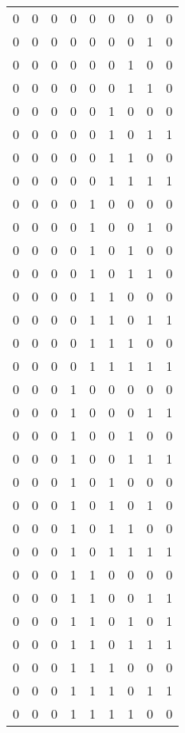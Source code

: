 \begin{longtable}[c]{rrrrrrrrr}
        0 & 0 & 0 & 0 & 0 & 0 & 0 & 0 & 0 \\
        0 & 0 & 0 & 0 & 0 & 0 & 0 & 1 & 0 \\
        0 & 0 & 0 & 0 & 0 & 0 & 1 & 0 & 0 \\
        0 & 0 & 0 & 0 & 0 & 0 & 1 & 1 & 0 \\
        0 & 0 & 0 & 0 & 0 & 1 & 0 & 0 & 0 \\
        0 & 0 & 0 & 0 & 0 & 1 & 0 & 1 & 1 \\
        0 & 0 & 0 & 0 & 0 & 1 & 1 & 0 & 0 \\
        0 & 0 & 0 & 0 & 0 & 1 & 1 & 1 & 1 \\
        0 & 0 & 0 & 0 & 1 & 0 & 0 & 0 & 0 \\
        0 & 0 & 0 & 0 & 1 & 0 & 0 & 1 & 0 \\
        0 & 0 & 0 & 0 & 1 & 0 & 1 & 0 & 0 \\
        0 & 0 & 0 & 0 & 1 & 0 & 1 & 1 & 0 \\
        0 & 0 & 0 & 0 & 1 & 1 & 0 & 0 & 0 \\
        0 & 0 & 0 & 0 & 1 & 1 & 0 & 1 & 1 \\
        0 & 0 & 0 & 0 & 1 & 1 & 1 & 0 & 0 \\
        0 & 0 & 0 & 0 & 1 & 1 & 1 & 1 & 1 \\
        0 & 0 & 0 & 1 & 0 & 0 & 0 & 0 & 0 \\
        0 & 0 & 0 & 1 & 0 & 0 & 0 & 1 & 1 \\
        0 & 0 & 0 & 1 & 0 & 0 & 1 & 0 & 0 \\
        0 & 0 & 0 & 1 & 0 & 0 & 1 & 1 & 1 \\
        0 & 0 & 0 & 1 & 0 & 1 & 0 & 0 & 0 \\
        0 & 0 & 0 & 1 & 0 & 1 & 0 & 1 & 0 \\
        0 & 0 & 0 & 1 & 0 & 1 & 1 & 0 & 0 \\
        0 & 0 & 0 & 1 & 0 & 1 & 1 & 1 & 1 \\
        0 & 0 & 0 & 1 & 1 & 0 & 0 & 0 & 0 \\
        0 & 0 & 0 & 1 & 1 & 0 & 0 & 1 & 1 \\
        0 & 0 & 0 & 1 & 1 & 0 & 1 & 0 & 1 \\
        0 & 0 & 0 & 1 & 1 & 0 & 1 & 1 & 1 \\
        0 & 0 & 0 & 1 & 1 & 1 & 0 & 0 & 0 \\
        0 & 0 & 0 & 1 & 1 & 1 & 0 & 1 & 1 \\
        0 & 0 & 0 & 1 & 1 & 1 & 1 & 0 & 0 \\

\end{longtable}
